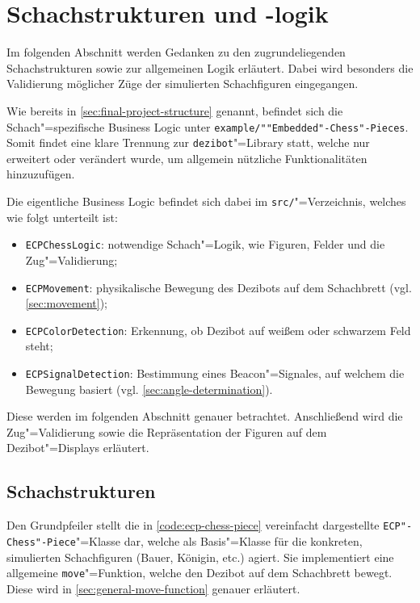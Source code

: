 
\section{Schachstrukturen und -logik}
\label{sec:chess-logic}

Im folgenden Abschnitt werden Gedanken zu den zugrundeliegenden Schachstrukturen sowie zur allgemeinen Logik erläutert. Dabei wird besonders die Validierung möglicher Züge der simulierten Schachfiguren eingegangen.

Wie bereits in \autoref{sec:final-project-structure} genannt, befindet sich die Schach"=spezifische Business Logic unter \texttt{example/""Embedded"-Chess"-Pieces}. Somit findet eine klare Trennung zur \texttt{dezibot}"=Library statt, welche nur erweitert oder verändert wurde, um allgemein nützliche Funktionalitäten hinzuzufügen.

Die eigentliche Business Logic befindet sich dabei im \texttt{src/}"=Verzeichnis, welches wie folgt unterteilt ist:

\begin{itemize}
    \item \texttt{ECPChessLogic}: notwendige Schach"=Logik, wie Figuren, Felder und die Zug"=Validierung;
    \item \texttt{ECPMovement}: physikalische Bewegung des Dezibots auf dem Schachbrett (vgl. \autoref{sec:movement});
    \item \texttt{ECPColorDetection}: Erkennung, ob Dezibot auf weißem oder schwarzem Feld steht;
    \item \texttt{ECPSignalDetection}: Bestimmung eines Beacon"=Signales, auf welchem die Bewegung basiert (vgl. \autoref{sec:angle-determination}).
\end{itemize}

Diese werden im folgenden Abschnitt genauer betrachtet. Anschließend wird die Zug"=Validierung sowie die Repräsentation der Figuren auf dem Dezibot"=Displays erläutert.


\subsection{Schachstrukturen}


Den Grundpfeiler stellt die in \autoref{code:ecp-chess-piece} vereinfacht dargestellte \texttt{ECP"-Chess"-Piece}"=Klasse dar, welche als Basis"=Klasse für die konkreten, simulierten Schachfiguren (Bauer, Königin, etc.) agiert. Sie implementiert eine allgemeine \texttt{move}"=Funktion, welche den Dezibot auf dem Schachbrett bewegt. Diese wird in \autoref{sec:general-move-function} genauer erläutert.

